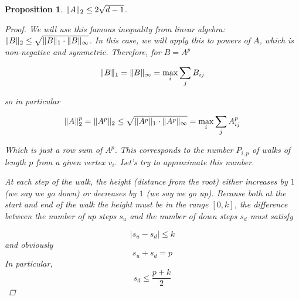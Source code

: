 \documentclass{amsart}
\theoremstyle{plain}
\newtheorem*{proposition}{\textbf{Proposition}}
\theoremstyle{definition}
\DeclarePairedDelimiter{\norm}{\lVert}{\rVert}
\begin{document}
    \begin{proposition} \label{prop:a}
        $\norm{A}_2 \leq 2 \sqrt{d - 1}$.
        \begin{proof}
            We will use this famous inequality from linear algebra:
            $\norm{B}_2 \leq \sqrt{ \norm{B}_1 \cdot \norm{B}_\infty }$.
            In this case, we will apply this to powers of $A$, which is non-negative and symmetric.
            Therefore, for $B = A^p$

            \begin{equation*}
                \norm{B}_1 = \norm{B}_{\infty} = \max_{i} \sum_{j} B_{ij}
            \end{equation*}

            so in particular

            \begin{equation}
                \norm{A}_2^p = \norm{A^p}_2 \leq \sqrt{\norm{A^p}_1 \cdot \norm{A^p}_{\infty}} = \max_{i} \sum_{j} A^p_{ij}
                \label{eq:norm_bound}
            \end{equation}

            Which is just a row sum of $A^p$.
            This corresponds to the number $P_{i, p}$ of walks of length $p$ from a given vertex $v_i$.
            Let's try to approximate this number.

            At each step of the walk, the height (distance from the root) either increases by $1$
            (we say we go \emph{down})
            or decreases by $1$ (we say we go \emph{up}).
            Because both at the start and end of the walk the height must be in the range $[0, k]$,
            the difference between the number of \emph{up} steps $s_{u}$
            and the number of \emph{down} steps $s_{d}$ must satisfy

            \begin{equation*}
                \lvert s_{u} - s_{d} \rvert \leq k
            \end{equation*}
            and obviously
            \begin{equation*}
                s_{u} + s_{d} = p
            \end{equation*}
            In particular,
            \begin{equation*}
                s_d \leq  \frac{p+k}{2}
            \end{equation*}


\end{proof}
\end{proposition}
\end{document}
